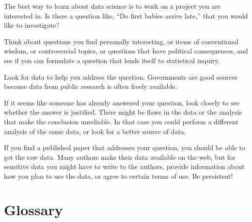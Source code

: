 \documentclass[12pt]{book}
\begin{document}
\begin{exercise}
The best way to learn about data science is to work on a project you are
interested in.  Is there a question like, ``Do first babies arrive
late,'' that you would like to investigate?

Think about questions you find personally interesting, or items of
conventional wisdom, or controversial topics, or questions that have
political consequences, and see if you can formulate a question that
lends itself to statistical inquiry.

Look for data to help you address the question.  Governments are good
sources because data from public research is often freely
available.

If it seems like someone has already answered your question, look
closely to see whether the answer is justified.  There might be flaws
in the data or the analysis that make the conclusion unreliable.  In
that case you could perform a different analysis of the same data, or
look for a better source of data.

If you find a published paper that addresses your question, you
should be able to get the raw data.  Many authors make their data
available on the web, but for sensitive data you might have to
write to the authors, provide information about how you plan to use
the data, or agree to certain terms of use.  Be persistent!

\end{exercise}


\section{Glossary}
\end{document}

